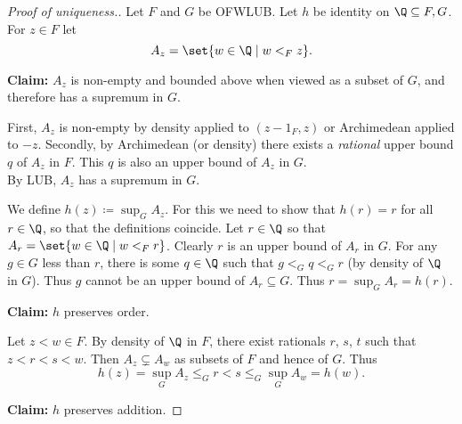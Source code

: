 \begin{proof}[Proof of uniqueness.]
    Let $F$ and $G$ be OFWLUB.
    Let $h$ be identity on $\Q \subseteq F, G$.
    For $z \in F$ let \[
        A_z = \set{w \in \Q \mid w <_F z}.
    \]

    \textbf{Claim:} $A_z$ is non-empty and bounded above when viewed as a
    subset of $G$, and therefore has a supremum in $G$.

    \hfill\begin{minipage}{0.9\textwidth}
        First, $A_z$ is non-empty by density applied to $(z-1_F, z)$ or
        Archimedean applied to $-z$.
        Secondly, by Archimedean (or density) there exists a \emph{rational}
        upper bound $q$ of $A_z$ in $F$.
        This $q$ is also an upper bound of $A_z$ in $G$. \\
        By LUB, $A_z$ has a supremum in $G$.
    \end{minipage}

    We define $h(z) \coloneq \sup_G A_z$.
    For this we need to show that $h(r) = r$ for all $r \in \Q$, so that the
    definitions coincide.
    Let $r \in \Q$ so that $A_r = \set{w \in \Q \mid w <_F r}$.
    Clearly $r$ is an upper bound of $A_r$ in $G$.
    For any $g \in G$ less than $r$, there is some $q \in \Q$ such that
    $g <_G q <_G r$ (by density of $\Q$ in $G$).
    Thus $g$ cannot be an upper bound of $A_r \subseteq G$.
    Thus $r = \sup_G A_r = h(r)$.

    \textbf{Claim:} $h$ preserves order.

    \hfill\begin{minipage}{0.9\textwidth}
        Let $z < w \in F$.
        By density of $\Q$ in $F$, there exist rationals $r$, $s$, $t$ such that
        $z < r < s < w$.
        Then $A_z \subsetneq A_w$ as subsets of $F$ and hence of $G$.
        Thus \[
            h(z) = \sup_G A_z \le_G r < s \le_G \sup_G A_w = h(w).
        \]
    \end{minipage}

    \textbf{Claim:} $h$ preserves addition.


\end{proof}

